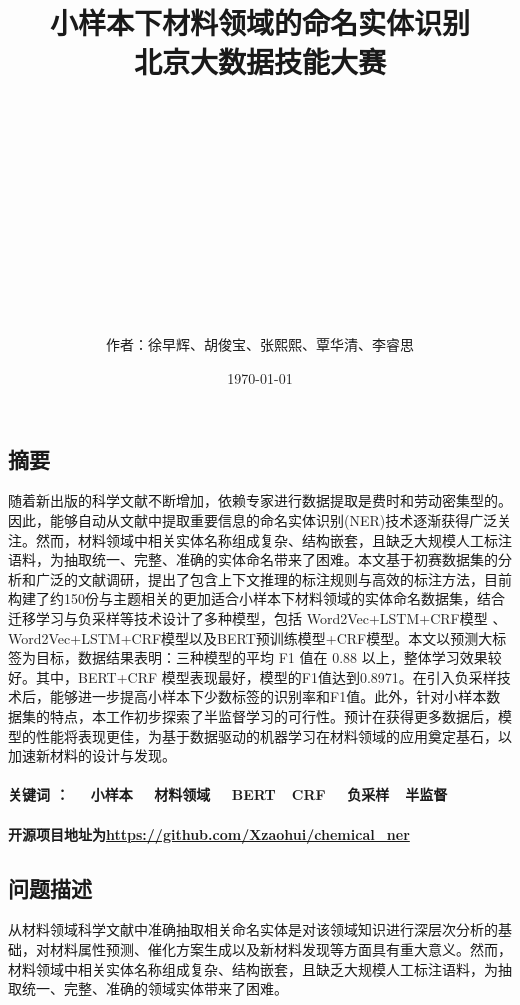 \documentclass{article}
\title{小样本下材料领域的命名实体识别\\ {\small 北京大数据技能大赛}}
\author{\\\\\\\\\\\\\\\\\\\\\\\\作者：徐早辉、胡俊宝、张熙熙、覃华清、李睿思}
\date{\today}
\begin{document}
	\maketitle
	\newpage
	\begin{center}
		\tableofcontents
	\end{center}
	
	\newpage
	\begin{center}
		\section{摘要}
	\end{center}
	
	随着新出版的科学文献不断增加，依赖专家进行数据提取是费时和劳动密集型的。因此，能够自动从文献中提取重要信息的命名实体识别(NER)技术逐渐获得广泛关注。然而，材料领域中相关实体名称组成复杂、结构嵌套，且缺乏大规模人工标注语料，为抽取统一、完整、准确的实体命名带来了困难。本文基于初赛数据集的分析和广泛的文献调研，提出了包含上下文推理的标注规则与高效的标注方法，目前构建了约150份与主题相关的更加适合小样本下材料领域的实体命名数据集，结合迁移学习与负采样等技术设计了多种模型，包括 Word2Vec+LSTM+CRF模型 、 Word2Vec+LSTM+CRF模型以及BERT预训练模型+CRF模型。本文以预测大标签为目标，数据结果表明：三种模型的平均 F1 值在 0.88 以上，整体学习效果较好。其中，BERT+CRF 模型表现最好，模型的F1值达到0.8971。在引入负采样技术后，能够进一步提高小样本下少数标签的识别率和F1值。此外，针对小样本数据集的特点，本工作初步探索了半监督学习的可行性。预计在获得更多数据后，模型的性能将表现更佳，为基于数据驱动的机器学习在材料领域的应用奠定基石，以加速新材料的设计与发现。
\paragraph{关键词 ： ~~小样本 ~~材料领域  ~~BERT~~CRF ~~负采样~~半监督}
	
\paragraph{开源项目地址为\url{https://github.com/Xzaohui/chemical_ner}}
	\newpage
	\begin{center}
		\section{问题描述}
	\end{center}
	
	
	从材料领域科学文献中准确抽取相关命名实体是对该领域知识进行深层次分析的基础，对材料属性预测、催化方案生成以及新材料发现等方面具有重大意义。然而，材料领域中相关实体名称组成复杂、结构嵌套，且缺乏大规模人工标注语料，为抽取统一、完整、准确的领域实体带来了困难。
	
\end{document}
